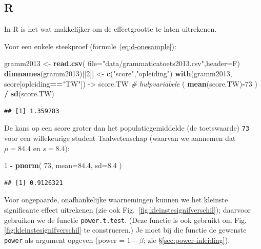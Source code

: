 \documentclass[
]{book}
\newenvironment{Shaded}{\begin{snugshade}}{\end{snugshade}}
\newcommand{\CommentTok}[1]{\textcolor[rgb]{0.56,0.35,0.01}{\textit{#1}}}
\newcommand{\DataTypeTok}[1]{\textcolor[rgb]{0.13,0.29,0.53}{#1}}
\newcommand{\DecValTok}[1]{\textcolor[rgb]{0.00,0.00,0.81}{#1}}
\newcommand{\FloatTok}[1]{\textcolor[rgb]{0.00,0.00,0.81}{#1}}
\newcommand{\KeywordTok}[1]{\textcolor[rgb]{0.13,0.29,0.53}{\textbf{#1}}}
\newcommand{\NormalTok}[1]{#1}
\newcommand{\OperatorTok}[1]{\textcolor[rgb]{0.81,0.36,0.00}{\textbf{#1}}}
\newcommand{\StringTok}[1]{\textcolor[rgb]{0.31,0.60,0.02}{#1}}
\begin{document}
\hypertarget{r-13}{%
\subsection{R}\label{r-13}}

In R is het wat makkelijker om de effectgrootte te laten uitrekenen.

Voor een enkele steekproef
(formule~\eqref{eq:d-onesample}):\\

\begin{Shaded}
\begin{Highlighting}[]
\NormalTok{gramm2013 \textless{}{-}}\StringTok{ }\KeywordTok{read.csv}\NormalTok{( }\DataTypeTok{file=}\StringTok{"data/grammaticatoets2013.csv"}\NormalTok{,}\DataTypeTok{header=}\NormalTok{F)}
\KeywordTok{dimnames}\NormalTok{(gramm2013)[[}\DecValTok{2}\NormalTok{]] \textless{}{-}}\StringTok{ }\KeywordTok{c}\NormalTok{(}\StringTok{"score"}\NormalTok{,}\StringTok{"opleiding"}\NormalTok{)}
\KeywordTok{with}\NormalTok{(gramm2013, score[opleiding}\OperatorTok{==}\StringTok{"TW"}\NormalTok{]) {-}\textgreater{}}\StringTok{ }\NormalTok{score.TW }\CommentTok{\# hulpvariabele}
\NormalTok{( }\KeywordTok{mean}\NormalTok{(score.TW)}\OperatorTok{{-}}\DecValTok{73}\NormalTok{ ) }\OperatorTok{/}\StringTok{ }\KeywordTok{sd}\NormalTok{(score.TW) }
\end{Highlighting}
\end{Shaded}

\begin{verbatim}
## [1] 1.359783
\end{verbatim}

De kans op een score groter dan het populatiegemiddelde (de toetswaarde) \texttt{73} voor een willekeurige student Taalwetenschap (waarvan we aannemen dat \(\mu=84.4\) en \(s=8.4\)):

\begin{Shaded}
\begin{Highlighting}[]
\DecValTok{1} \OperatorTok{{-}}\StringTok{ }\KeywordTok{pnorm}\NormalTok{( }\DecValTok{73}\NormalTok{, }\DataTypeTok{mean=}\FloatTok{84.4}\NormalTok{, }\DataTypeTok{sd=}\FloatTok{8.4}\NormalTok{ ) }
\end{Highlighting}
\end{Shaded}

\begin{verbatim}
## [1] 0.9126321
\end{verbatim}

Voor ongepaarde, onafhankelijke waarnemingen kunnen we het kleinste
significante effect uitrekenen (zie ook
Fig.~\ref{fig:kleinstesignifverschil}); daarvoor gebruiken we de functie \texttt{power.t.test}. (Deze functie is ook gebruikt om Fig.\ref{fig:kleinstesignifverschil} te construeren.)
Je moet bij die functie de gewenste \texttt{power} als
argument opgeven (power = \(1-\beta\); zie
§\ref{sec:power-inleiding}).
\end{document}
